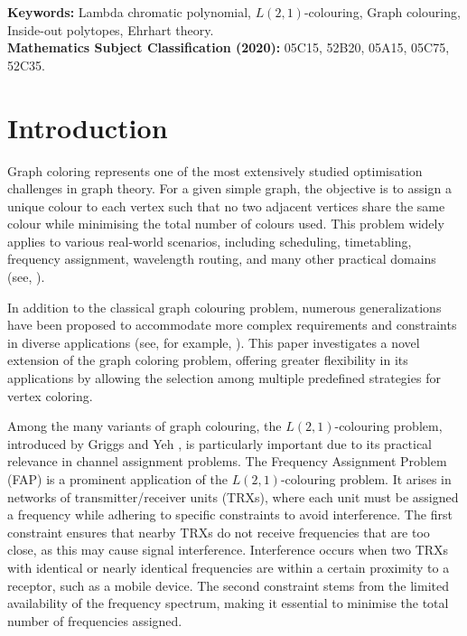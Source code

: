 \documentclass{birkjour}
\theoremstyle{definition}
\theoremstyle{remark}
\numberwithin{equation}{section}
\begin{document}
\maketitle
\noindent
\textbf{Keywords:} Lambda chromatic polynomial, $L(2,1)$-colouring, Graph colouring, Inside-out polytopes, Ehrhart theory.\\

\noindent
\textbf{Mathematics Subject Classification (2020):} 05C15, 52B20, 05A15, 05C75, 52C35.




\section{Introduction}
Graph coloring represents one of the most extensively studied optimisation challenges in graph theory. For a given simple graph, the objective is to assign a unique colour to each vertex such that no two adjacent vertices share the same colour while minimising the total number of colours used. This problem widely applies to various real-world scenarios, including scheduling, timetabling, frequency assignment, wavelength routing, and many other practical domains (see, \cite{DA, GMO, GKO, QBM}).

In addition to the classical graph colouring problem, numerous generalizations have been proposed to accommodate more complex requirements and constraints in diverse applications (see, for example, \cite{DEW, SDW}). This paper investigates a novel extension of the graph coloring problem, offering greater flexibility in its applications by allowing the selection among multiple predefined strategies for vertex coloring.

Among the many variants of graph colouring, the $L(2,1)$-colouring problem, introduced by Griggs and Yeh \cite{GY}, is particularly important due to its practical relevance in channel assignment problems. The Frequency Assignment Problem (FAP) is a prominent application of the $L(2,1)$-colouring problem. It arises in networks of transmitter/receiver units (TRXs), where each unit must be assigned a frequency while adhering to specific constraints to avoid interference. The first constraint ensures that nearby TRXs do not receive frequencies that are too close, as this may cause signal interference. Interference occurs when two TRXs with identical or nearly identical frequencies are within a certain proximity to a receptor, such as a mobile device. The second constraint stems from the limited availability of the frequency spectrum, making it essential to minimise the total number of frequencies assigned.
\end{document}
